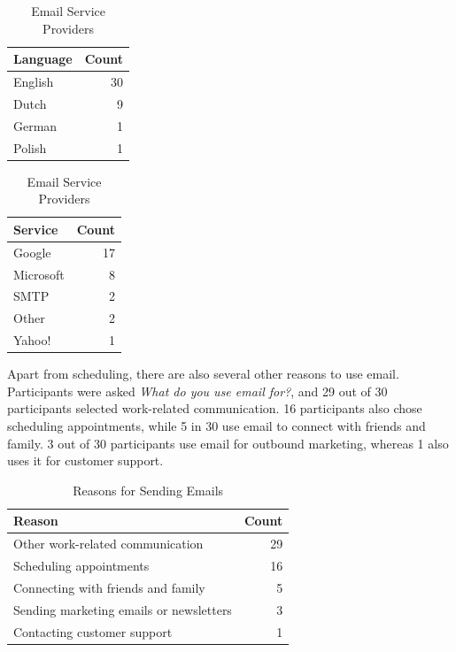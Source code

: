 \documentclass{article}
\begin{document}
\begin{table}[!htb]
	\begin{minipage}{.5\linewidth}
		\caption{Email Languages}
		\centering
		\begin{tabular}{lr}
			\hline
			\textbf{Language} & \textbf{Count} \\
			\hline
			English           & 30             \\
			Dutch             & 9              \\
			German            & 1              \\
			Polish            & 1              \\
			\hline
		\end{tabular}
	\end{minipage}%
	\hspace{.1cm}
	\begin{minipage}{.5\linewidth}
		\centering
		\caption{Email Service Providers}
		\begin{tabular}{lr}
			\hline
			\textbf{Service} & \textbf{Count} \\
			\hline
			Google           & 17             \\
			Microsoft        & 8              \\
			SMTP             & 2              \\
			Other            & 2              \\
			Yahoo!           & 1              \\
			\hline
		\end{tabular}
	\end{minipage} 
\end{table}

Apart from scheduling, there are also several other reasons to use email. Participants were asked \emph{What do you use email for?}, and 29 out of 30 participants selected work-related communication. 16 participants also chose scheduling appointments, while 5 in 30 use email to connect with friends and family. 3 out of 30 participants use email for outbound marketing, whereas 1 also uses it for customer support.

\begin{table}[!htb]
	\begin{minipage}{1\linewidth}
		\caption{Reasons for Sending Emails}
		\centering
		\begin{tabular}{lr}
			\hline
			\textbf{Reason}                         & \textbf{Count} \\
			\hline
			Other work-related communication        & 29             \\
			Scheduling appointments                 & 16             \\
			Connecting with friends and family      & 5              \\
			Sending marketing emails or newsletters & 3              \\
			Contacting customer support             & 1              \\
			\hline
		\end{tabular}
	\end{minipage}%
\end{table}
\end{document}

